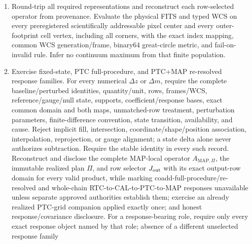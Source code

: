 \documentclass[10pt]{article}
\begin{document}
\begin{enumerate}
before exact owner acceptance, Registry/source binding, and activation. After
an active successor exists, evaluate all four object-decision axes separately
from the MAP lifecycle and attempt outcome; then independently request all
three coadd roles and exercise admitted
centered-integer coaddition, exact coadd output-row identity, and companion
placement.  If a canonical target grid was requested before observation-map
construction, verify that every constructed map honors it.  Otherwise verify
that already existing compatible bundles, including persisted coadd-only
inputs, may select a common coadd target and use exact centered-integer
embedding without modifying or relabeling their scientific samples.  An
explicit crop creates a new row-selected product with its own identity and
provenance.
\item Round-trip all required representations and reconstruct each
row-selected operator from provenance. Evaluate the physical FITS and typed
WCS on every preregistered scientifically addressable pixel center and every
outer-footprint cell vertex, including all corners, with the exact index
mapping, common WCS generation/frame, binary64 great-circle metric, and
fail-on-invalid rule. Infer no continuum maximum from that finite population.
\item Exercise fixed-state, PTC full-procedure, and PTC+MAP re-resolved
response families. For every numerical \(\Delta z\) or \(\Delta m\), require
the complete baseline/perturbed identities, quantity/unit, rows, frames/WCS,
reference/gauge/null state, supports, coefficient/response bases, exact common
domain and both maps, unmatched-row treatment, perturbation parameters,
finite-difference convention, state transition, availability, and cause.
Reject implicit fill, intersection, coordinate/shape/position association,
interpolation, reprojection, or gauge alignment; a state delta alone never
authorizes subtraction. Require the stable
\SCIMapComparisonSpaceRecordId{} identity in every such record. Reconstruct and disclose the complete MAP-local operator
\(A_{{\mathrm{MAP}},\Pi}\), the immutable realized plan \(\Pi\), and row
selector \(J_{\rm out}\) with its exact output-row domain for every valid
product, while
marking coadd-full-procedure/re-resolved and whole-chain
RTC-to-CAL-to-PTC-to-MAP responses unavailable unless separate approved
authorities establish them; exercise an already realized
PTC-grid companion applied exactly once; and honest response/covariance
disclosure. For a response-bearing role, require only every exact response
object named by that role; absence of a different unselected response family

\end{enumerate}
\end{document}
